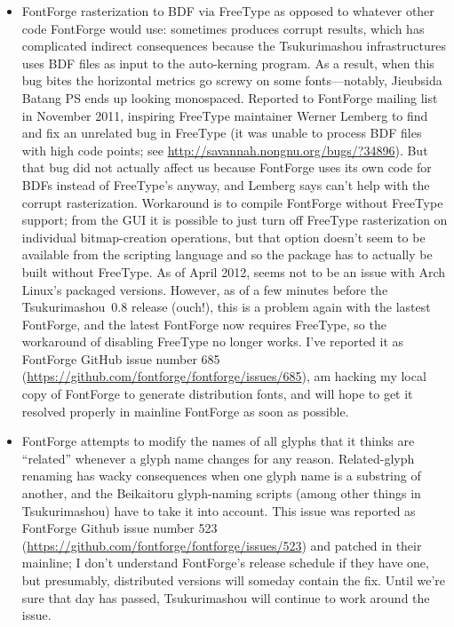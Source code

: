 \documentclass[14pt]{extarticle}
\begin{document}
\begin{itemize}
  \item FontForge rasterization to BDF via FreeType as opposed to whatever
    other code FontForge would use:  sometimes produces corrupt results,
    which has complicated indirect consequences because the Tsukurimashou
    infrastructures uses BDF files as input to the auto-kerning program.  As
    a result, when this bug bites the horizontal metrics go screwy on some
    fonts---notably, Jieubsida Batang PS ends up looking monospaced. 
    Reported to FontForge mailing list in November 2011, inspiring FreeType
    maintainer Werner Lemberg to find and fix an unrelated bug in FreeType
    (it was unable to process BDF files with high code points; see
    \url{http://savannah.nongnu.org/bugs/?34896}).  But that bug did not
    actually affect us because FontForge uses its own code for BDFs instead
    of FreeType's anyway, and Lemberg says can't help with the corrupt
    rasterization.  Workaround is to compile FontForge without FreeType
    support; from the GUI it is possible to just turn off FreeType
    rasterization on individual bitmap-creation operations, but that option
    doesn't seem to be available from the scripting language and so the
    package has to actually be built without FreeType.  As of April 2012,
    seems not to be an issue with Arch Linux's packaged versions.  However,
    as of a few minutes before the Tsukurimashou~0.8 release (ouch!), this
    is a problem again with the lastest FontForge, and the latest FontForge
    now requires FreeType, so the workaround of disabling FreeType no longer
    works.  I've reported it as FontForge GitHub issue number 685
    (\url{https://github.com/fontforge/fontforge/issues/685}), am hacking my
    local copy of FontForge to generate distribution fonts, and will hope to
    get it resolved properly in mainline FontForge as soon as possible.

  \item FontForge attempts to modify the names of all glyphs that it thinks
    are ``related'' whenever a glyph name changes for any reason. 
    Related-glyph renaming has wacky consequences when one glyph name is a
    substring of another, and the Beikaitoru glyph-naming scripts (among
    other things in Tsukurimashou) have to take it into account.  This issue
    was reported as FontForge Github issue number 523
    (\url{https://github.com/fontforge/fontforge/issues/523}) and patched in
    their mainline; I don't understand FontForge's release schedule if they
    have one, but presumably, distributed versions will someday contain the
    fix.  Until we're sure that day has passed, Tsukurimashou will continue
    to work around the issue.


\end{itemize}
\end{document}
